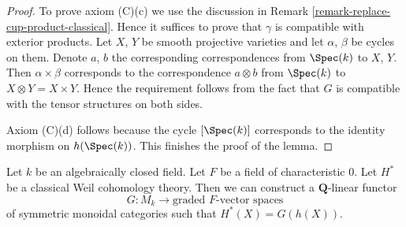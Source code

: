 \begin{proof}
\medskip\noindent
To prove axiom (C)(c) we use the discussion in
Remark \ref{remark-replace-cup-product-classical}.
Hence it suffices to prove that $\gamma$ is compatible with
exterior products. Let $X$, $Y$ be smooth projective varieties and
let $\alpha$, $\beta$ be cycles on them. Denote
$a$, $b$ the corresponding correspondences from $\Spec(k)$ to
$X$, $Y$. Then $\alpha \times \beta$ corresponds to the
correspondence $a \otimes b$ from $\Spec(k)$ to $X \otimes Y = X \times Y$.
Hence the requirement follows from the fact that $G$ is
compatible with the tensor structures on both sides.

\medskip\noindent
Axiom (C)(d) follows because the cycle $[\Spec(k)]$
corresponds to the identity morphism on $h(\Spec(k))$.
This finishes the proof of the lemma.
\end{proof}

\begin{lemma}
\label{lemma-from-weil-to-functor-classical}
Let $k$ be an algebraically closed field. Let $F$ be a field of
characteristic $0$. Let $H^*$ be a classical Weil cohomology theory.
Then we can construct a $\mathbf{Q}$-linear functor
$$
G : M_k \longrightarrow \text{graded }F\text{-vector spaces}
$$
of symmetric monoidal categories such that $H^*(X) = G(h(X))$.
\end{lemma}

